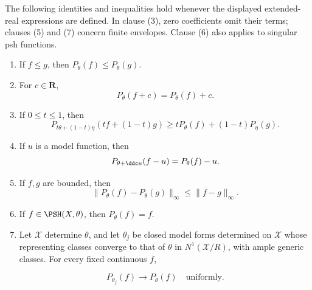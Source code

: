\begin{proposition}\label{prop:ch23-formal-envelope-calculus}
The following identities and inequalities hold whenever the displayed
extended-real expressions are defined.  In clause (3), zero coefficients
omit their terms; clauses (5) and (7) concern finite envelopes.  Clause (6)
also applies to singular psh functions.

\begin{enumerate}
\item If $f\leq g$, then $P_\theta(f)\leq P_\theta(g)$.
\item For $c\in\mathbf R$,
\begin{equation}\label{eq:ch23-translation}
                         P_\theta(f+c)=P_\theta(f)+c.
\end{equation}

\item If $0\leq t\leq1$, then
\begin{equation}\label{eq:ch23-joint-concavity}
 P_{t\theta+(1-t)\eta}(tf+(1-t)g)
 \geq tP_\theta(f)+(1-t)P_\eta(g).
\end{equation}

\item If $u$ is a model function, then
\begin{equation}\label{eq:ch23-reference-change}
 P_{\theta+\ddc u}(f-u)=P_\theta(f)-u.
\end{equation}

\item If $f,g$ are bounded, then
\begin{equation}\label{eq:ch23-envelope-contraction}
       \|P_\theta(f)-P_\theta(g)\|_\infty
       \leq\|f-g\|_\infty.
\end{equation}

\item If $f\in\PSH(X,\theta)$, then $P_\theta(f)=f$.
\item Let $\mathcal X$ determine $\theta$, and let $\theta_j$ be closed
model forms determined on $\mathcal X$ whose representing classes converge
to that of $\theta$ in $N^1(\mathcal X/R)$, with ample generic classes.
For every fixed continuous $f$,

\[
                       P_{\theta_j}(f)\longrightarrow P_\theta(f)
                       \quad\text{uniformly}.
\]
\end{enumerate}
\end{proposition}

